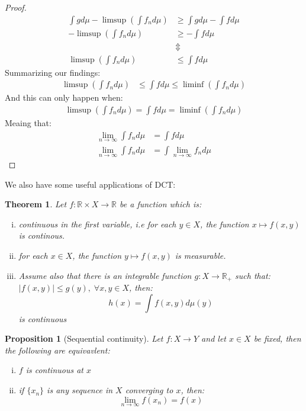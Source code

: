 \documentclass{article}
\newcommand{\R}{\mathbb{R}}
\newtheorem{prop}{Proposition}
\newtheorem{proof}{Proof}
\newtheorem{theorem}{Theorem}
\begin{document}
\begin{proof}
\begin{align*}
\int gd\mu - \limsup\left(\int f_{n}d\mu\right) &\geq  \int gd\mu - \int fd\mu \\ 
-\limsup\left(\int f_{n}d\mu\right) &\geq - \int fd\mu \\ 
&\Updownarrow \\ 
\limsup\left(\int f_{n}d\mu\right) &\leq \int fd\mu
\end{align*}
Summarizing our findings: 
\begin{align*}
\limsup\left(\int f_{n}d\mu\right) &\leq \int fd\mu \leq  \liminf\left(\int f_{n}d\mu\right)  
\end{align*}
And this can only happen when: 
\begin{align*}
\limsup\left(\int f_{n}d\mu\right) = \int fd\mu =  \liminf\left(\int f_{n}d\mu\right)    
\end{align*}
Meaing that: 
\begin{align*}
\lim_{n\to \infty}\int f_{n}d\mu &= \int fd\mu \\ 
\lim_{n\to \infty}\int f_{n}d\mu &= \int \lim_{n\to \infty}f_{n}d\mu
\end{align*}
\end{proof}


We also have some useful applications of DCT: 

\begin{theorem}
Let $f:\R\times X\to \R$ be a function which is: 
\begin{enumerate}[i)]
    \item continuous in the first variable, i.e for each $y\in X$, the function $x \mapsto f(x,y)$ is continous. 
    \item for each $x\in X$, the function $y\mapsto f(x,y)$ is measurable. \item Assume also that there is an integrable function $g:X \to \R_{+}$ such that: $|f(x,y)|\leq g(y), \; \forall x,y\in X$, then: 
    \[h(x) = \int f(x,y)d\mu(y)
    \] 
    is continuous
\end{enumerate}
\end{theorem}

\newpage
\begin{prop}[Sequential continuity]
\label{prop: sequential continuity}
Let $f:X\to Y$ and let $x\in X$ be fixed, then the following are equivavlent: 
\begin{enumerate}[i)]
    \item $f$ is continuous at $x$
    \item if $\{x_{n}\}$ is any sequence in $X$ converging to $x$, then: 
    \[\lim_{n\to \infty}f(x_{n}) = f(x)
    \]
\end{enumerate}
\end{prop}
\end{document}
